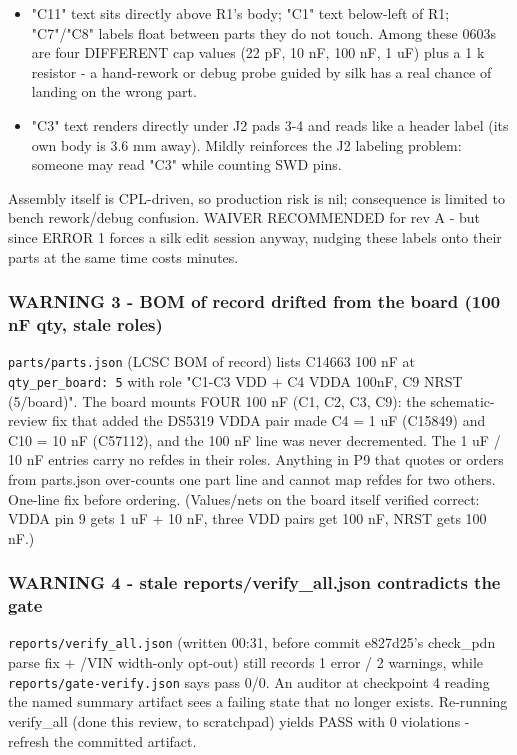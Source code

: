 \documentclass[11pt,a4paper]{article}
\begin{document}
\begin{itemize}
\item "C11" text sits directly above R1's body; "C1" text below-left of R1;
"C7"/"C8" labels float between parts they do not touch. Among these
0603s are four DIFFERENT cap values (22 pF, 10 nF, 100 nF, 1 uF) plus a
1 k resistor - a hand-rework or debug probe guided by silk has a real
chance of landing on the wrong part.
\item "C3" text renders directly under J2 pads 3-4 and reads like a header
label (its own body is 3.6 mm away). Mildly reinforces the J2 labeling
problem: someone may read "C3" while counting SWD pins.
\end{itemize}
Assembly itself is CPL-driven, so production risk is nil; consequence is limited to bench rework/debug confusion. WAIVER RECOMMENDED for rev A - but since ERROR 1 forces a silk edit session anyway, nudging these labels onto their parts at the same time costs minutes.

\subsubsection*{WARNING 3 - BOM of record drifted from the board (100 nF qty, stale roles)}
\texttt{parts/parts.json} (LCSC BOM of record) lists C14663 100 nF at \texttt{qty\_per\_board: 5} with role "C1-C3 VDD + C4 VDDA 100nF, C9 NRST (5/board)". The board mounts FOUR 100 nF (C1, C2, C3, C9): the schematic-review fix that added the DS5319 VDDA pair made C4 = 1 uF (C15849) and C10 = 10 nF (C57112), and the 100 nF line was never decremented. The 1 uF / 10 nF entries carry no refdes in their roles. Anything in P9 that quotes or orders from parts.json over-counts one part line and cannot map refdes for two others. One-line fix before ordering. (Values/nets on the board itself verified correct: VDDA pin 9 gets 1 uF + 10 nF, three VDD pairs get 100 nF, NRST gets 100 nF.)

\subsubsection*{WARNING 4 - stale reports/verify\_all.json contradicts the gate}
\texttt{reports/verify\_all.json} (written 00:31, before commit e827d25's check\_pdn parse fix + /VIN width-only opt-out) still records 1 error / 2 warnings, while \texttt{reports/gate-verify.json} says pass 0/0. An auditor at checkpoint 4 reading the named summary artifact sees a failing state that no longer exists. Re-running verify\_all (done this review, to scratchpad) yields PASS with 0 violations - refresh the committed artifact.
\end{document}
